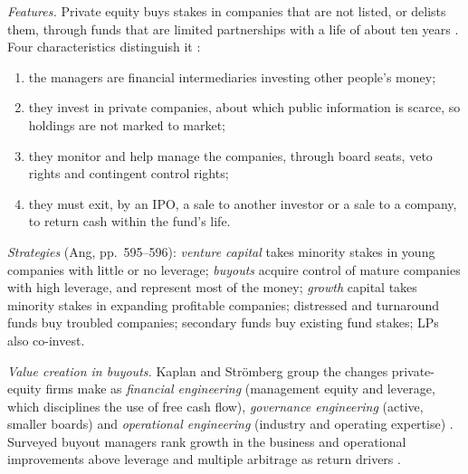 \begin{qfdefinition}\label{def:private-equity-features}
 \emph{Features.} Private equity buys stakes in companies that are not listed, or delists them, through funds that are limited partnerships with a life of about ten years \citep[pp.~594--595]{s7-ang}. Four characteristics distinguish it \citep[pp.~5--7]{metrick-yasuda-survey-2011}:
\begin{enumerate}
\item the managers are financial intermediaries investing other people's money;
\item they invest in private companies, about which public information is scarce, so holdings are not marked to market;
\item they monitor and help manage the companies, through board seats, veto rights and contingent control rights;
\item they must exit, by an IPO, a sale to another investor or a sale to a company, to return cash within the fund's life.
\end{enumerate}

\emph{Strategies} (Ang, pp.~595--596): \emph{venture capital} takes minority stakes in young companies with little or no leverage; \emph{buyouts} acquire control of mature companies with high leverage, and represent most of the money; \emph{growth} capital takes minority stakes in expanding profitable companies; distressed and turnaround funds buy troubled companies; secondary funds buy existing fund stakes; LPs also co-invest.

\emph{Value creation in buyouts.} Kaplan and Str\"omberg group the changes private-equity firms make as \emph{financial engineering} (management equity and leverage, which disciplines the use of free cash flow), \emph{governance engineering} (active, smaller boards) and \emph{operational engineering} (industry and operating expertise) \citep[NBER WP 14207, pp.~13--16]{pe-kaplan-stromberg-2009}. Surveyed buyout managers rank growth in the business and operational improvements above leverage and multiple arbitrage as return drivers \citep[NBER WP 21133, p.~27]{w5-gompers-kaplan-mukharlyamov}.


\end{qfdefinition}
